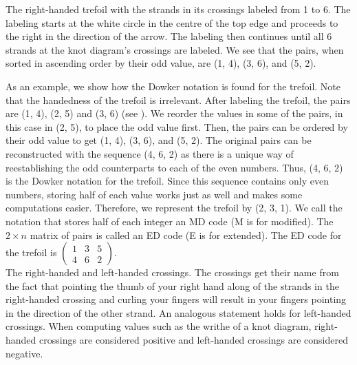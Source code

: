 \begin{paper}
{\begin{center}\end{center}}
{The right-handed trefoil with the strands in its crossings labeled from 1 to 6.
The labeling starts at the white circle in the centre of the top edge and
proceeds to the right in the direction of the arrow.
The labeling then continues until all 6 strands at the knot diagram's crossings
are labeled.
We see that the pairs, when sorted in ascending order by their odd value, are
(1, 4), (3, 6), and (5, 2).}

As an example, we show how the Dowker notation is found for the trefoil.
Note that the handedness of the trefoil is irrelevant.
After labeling the trefoil, the pairs are (1, 4), (2, 5) and (3, 6) (see
\figLabeled).
We reorder the values in some of the pairs, in this case in (2, 5), to place the
odd value first.
Then, the pairs can be ordered by their odd value to get (1, 4), (3, 6), and
(5, 2).
The original pairs can be reconstructed with the sequence (4, 6, 2) as there is
a unique way of reestablishing the odd counterparts to each of the even numbers.
Thus, (4, 6, 2) is the Dowker notation for the trefoil.
Since this sequence contains only even numbers, storing half of each value works
just as well and makes some computations easier.
Therefore, we represent the trefoil by (2, 3, 1).
We call the notation that stores half of each integer an MD code (M is for
modified).
The $2\times n$ matrix of pairs is called an ED code (E is for extended).
The ED code for the trefoil is $\begin{pmatrix}1&3&5\\4&6&2\end{pmatrix}$.\\

{The right-handed and left-handed crossings.
The crossings get their name from the fact that pointing the thumb of your right
hand along of the strands in the right-handed crossing and curling your fingers
will result in your fingers pointing in the direction of the other strand.
An analogous statement holds for left-handed crossings.
When computing values such as the writhe of a knot diagram, right-handed
crossings are considered positive and left-handed crossings are considered
negative.}


\end{paper}
